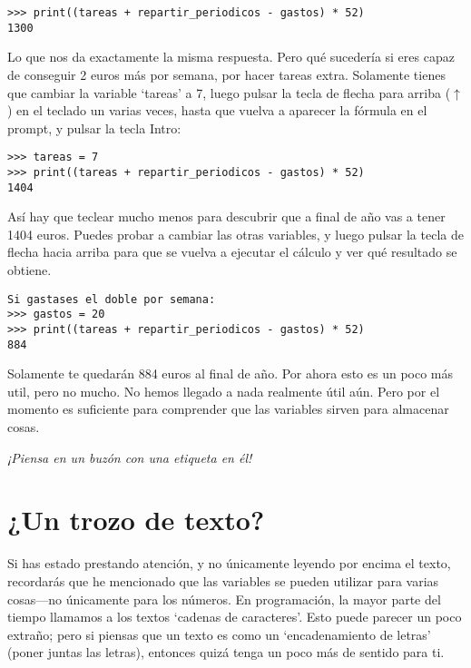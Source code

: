 \begin{listing}
\begin{verbatim}
>>> print((tareas + repartir_periodicos - gastos) * 52)
1300
\end{verbatim}
\end{listing}

Lo que nos da exactamente la misma respuesta. Pero qué sucedería si eres capaz de conseguir 2 euros más por semana, por hacer tareas extra.  Solamente tienes que cambiar la variable `tareas' a 7, luego pulsar la tecla de flecha para arriba ($\uparrow$) en el teclado un varias veces, hasta que vuelva a aparecer la fórmula en el prompt, y pulsar la tecla Intro:

\begin{listing}
\begin{verbatim}
>>> tareas = 7
>>> print((tareas + repartir_periodicos - gastos) * 52)
1404
\end{verbatim}
\end{listing}

Así hay que teclear mucho menos para descubrir que a final de año vas a tener 1404 euros. Puedes probar a cambiar las otras variables, y luego pulsar la tecla de flecha hacia arriba para que se vuelva a ejecutar el cálculo y ver qué resultado se obtiene.

\begin{listing}
\begin{verbatim}
Si gastases el doble por semana:
>>> gastos = 20
>>> print((tareas + repartir_periodicos - gastos) * 52)
884
\end{verbatim}
\end{listing}

Solamente te quedarán 884 euros al final de año. Por ahora esto es un poco más util, pero no mucho. No hemos llegado a nada realmente útil aún. Pero por el momento es suficiente para comprender que las variables sirven para almacenar cosas.

\noindent
\emph{¡Piensa en un buzón con una etiqueta en él!}

\section{¿Un trozo de texto?}

Si has estado prestando atención, y no únicamente leyendo por encima el texto, recordarás que he mencionado que las variables se pueden utilizar para varias cosas---no únicamente para los números. En programación, la mayor parte del tiempo llamamos a los textos `cadenas de caracteres'. Esto puede parecer un poco extraño; pero si piensas que un texto es como un `encadenamiento de letras' (poner juntas las letras), entonces quizá tenga un poco más de sentido para ti.

